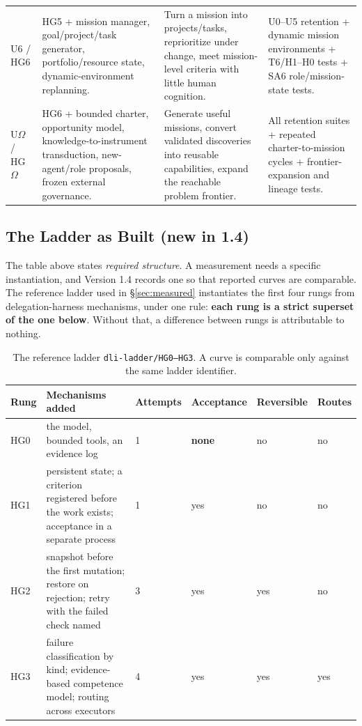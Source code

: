 \documentclass[11pt]{article}
\theoremstyle{definition}
\newcommand{\Om}{\ensuremath{\Omega}}
\begin{document}
\begin{table}[h]
\begin{tabularx}{\textwidth}{@{}p{}ZZZ@{}}
U6 / HG6 & HG5 + mission manager, goal/project/task generator, portfolio/resource state, dynamic-environment replanning. & Turn a mission into projects/tasks, reprioritize under change, meet mission-level criteria with little human cognition. & U0--U5 retention + dynamic mission environments + T6/H1--H0 tests + SA6 role/mission-state tests. \\
U\Om{} / HG\Om{} & HG6 + bounded charter, opportunity model, knowledge-to-instrument transduction, new-agent/role proposals, frozen external governance. & Generate useful missions, convert validated discoveries into reusable capabilities, expand the reachable problem frontier. & All retention suites + repeated charter-to-mission cycles + frontier-expansion and lineage tests. \\
\bottomrule
\end{tabularx}
\end{table}

\subsection{The Ladder as Built (new in 1.4)}\label{sec:built}

The table above states \emph{required structure}. A measurement needs a specific instantiation, and Version 1.4 records one so that reported curves are comparable. The reference ladder used in \S\ref{sec:measured} instantiates the first four rungs from delegation-harness mechanisms, under one rule: \textbf{each rung is a strict superset of the one below}. Without that, a difference between rungs is attributable to nothing.

\begin{table}[h]
\centering\small
\begin{tabularx}{\textwidth}{@{}lYllll@{}}
\toprule
Rung & Mechanisms added & Attempts & Acceptance & Reversible & Routes \\
\midrule
HG0 & the model, bounded tools, an evidence log & 1 & \textbf{none} & no & no \\
HG1 & persistent state; a criterion registered before the work exists; acceptance in a separate process & 1 & yes & no & no \\
HG2 & snapshot before the first mutation; restore on rejection; retry with the failed check named & 3 & yes & yes & no \\
HG3 & failure classification by kind; evidence-based competence model; routing across executors & 4 & yes & yes & yes \\
\bottomrule
\end{tabularx}
\caption{The reference ladder \texttt{dli-ladder/HG0--HG3}. A curve is comparable only against the same ladder identifier.}
\end{table}
\end{document}

